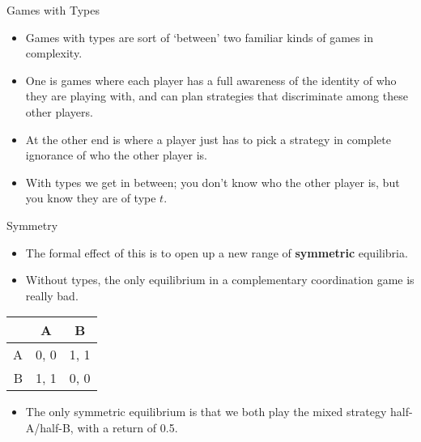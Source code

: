 \documentclass[
  ignorenonframetext,
]{beamer}
\providecommand{\tightlist}{%
  \setlength{\itemsep}{0pt}\setlength{\parskip}{0pt}}
\begin{document}
\begin{frame}{Games with Types}
\protect\hypertarget{games-with-types}{}
\begin{itemize}
\tightlist
\item
  Games with types are sort of `between' two familiar kinds of games in
  complexity.
\item
  One is games where each player has a full awareness of the identity of
  who they are playing with, and can plan strategies that discriminate
  among these other players.
\item
  At the other end is where a player just has to pick a strategy in
  complete ignorance of who the other player is.
\item
  With types we get in between; you don't know who the other player is,
  but you know they are of type \(t\).
\end{itemize}
\end{frame}

\begin{frame}{Symmetry}
\protect\hypertarget{symmetry}{}
\begin{itemize}
\tightlist
\item
  The formal effect of this is to open up a new range of
  \textbf{symmetric} equilibria.
\item
  Without types, the only equilibrium in a complementary coordination
  game is really bad.
\end{itemize}

\begin{longtable}[]{@{}rcc@{}}
\toprule
& A & B \\
\midrule
\endhead
A & 0, 0 & 1, 1 \\
B & 1, 1 & 0, 0 \\
\bottomrule
\end{longtable}

\begin{itemize}
\tightlist
\item
  The only symmetric equilibrium is that we both play the mixed strategy
  half-A/half-B, with a return of 0.5.
\end{itemize}
\end{frame}
\end{document}
